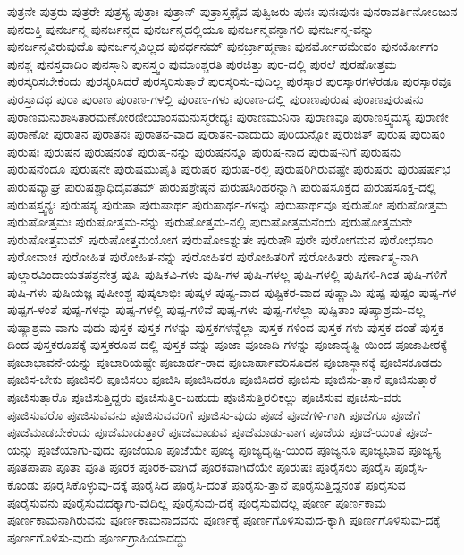 {ಪುತ್ರನೇ
ಪುತ್ರರು
ಪುತ್ರರೇ
ಪುತ್ರಸ್ಯ
ಪುತ್ರಾಃ
ಪುತ್ರಾನ್
ಪುತ್ರಾಸ್ತಥೈವ
ಪುತ್ವಿಜರು
ಪುನಃ
ಪುನಃಪುನಃ
ಪುನರಾವರ್ತಿನೋಽಜುನ
ಪುನರುಕ್ತಿ
ಪುನರ್ಜನ್ಮ
ಪುನರ್ಜನ್ಮದ
ಪುನರ್ಜನ್ಮದಲ್ಲಿಯೂ
ಪುನರ್ಜನ್ಮವನ್ನಾಗಲಿ
ಪುನರ್ಜನ್ಮ-ವನ್ನು
ಪುನರ್ಜನ್ಮವಿರುವುದೊ
ಪುನರ್ಜನ್ಮವಿಲ್ಲದ
ಪುನರ್ಧನಮ್
ಪುನರ್ಬ್ರಾಹ್ಮಣಾಃ
ಪುನರ್ಮೋಹಮೇವಂ
ಪುನರ್ಯೋಗಂ
ಪುನಶ್ಚ
ಪುನಸ್ತವಾದಿಂ
ಪುನಸ್ತಾನಿ
ಪುನಸ್ತ್ವಂ
ಪುಮಾಂಶ್ಚರತಿ
ಪುರಜಿತ್ತು
ಪುರ-ದಲ್ಲಿ
ಪುರಲೆ
ಪುರಷೋತ್ತಮ
ಪುರಸ್ಕರಿಸಬೇಕೆಂದು
ಪುರಸ್ಕರಿಸಿದರೆ
ಪುರಸ್ಕರಿಸುತ್ತಾರೆ
ಪುರಸ್ಕರಿಸು-ವುದಿಲ್ಲ
ಪುರಸ್ಕಾರ
ಪುರಸ್ಕಾರಗಳೆರಡೂ
ಪುರಸ್ಕಾರವೂ
ಪುರಸ್ತಾದಥ
ಪುರಾ
ಪುರಾಣ
ಪುರಾಣ-ಗಳಲ್ಲಿ
ಪುರಾಣ-ಗಳು
ಪುರಾಣ-ದಲ್ಲಿ
ಪುರಾಣಪುರುಷ
ಪುರಾಣಪುರುಷನು
ಪುರಾಣಮನುಶಾಸಿತಾರಮಣೋರಣೀಯಾಂಸಮನುಸ್ಮರೇದ್ಯಃ
ಪುರಾಣಮುನಿನಾ
ಪುರಾಣವೂ
ಪುರಾಣಸ್ತ್ವಮಸ್ಯ
ಪುರಾಣೀ
ಪುರಾಣೋ
ಪುರಾತನ
ಪುರಾತನಃ
ಪುರಾತನ-ವಾದ
ಪುರಾತನ-ವಾದುದು
ಪುರಿಯನ್ನೋ
ಪುರುಜಿತ್
ಪುರುಷ
ಪುರುಷಂ
ಪುರುಷಃ
ಪುರುಷನ
ಪುರುಷನಂತೆ
ಪುರುಷ-ನನ್ನು
ಪುರುಷನನ್ನೂ
ಪುರುಷ-ನಾದ
ಪುರುಷ-ನಿಗೆ
ಪುರುಷನು
ಪುರುಷನೆಂದೂ
ಪುರುಷನೇ
ಪುರುಷಮುಪೈತಿ
ಪುರುಷರ
ಪುರುಷ-ರಲ್ಲಿ
ಪುರುಷರಿಗಿರುವಷ್ಟೇ
ಪುರುಷರು
ಪುರುಷರ್ಷಭ
ಪುರುಷವ್ಯಾಘ್ರ
ಪುರುಷಶ್ಚಾಧಿದೈವತಮ್
ಪುರುಷಶ್ರೇಷ್ಠನೆ
ಪುರುಷಸಿಂಹರನ್ನಾಗಿ
ಪುರುಷಸೂಕ್ತದ
ಪುರುಷಸೂಕ್ತ-ದಲ್ಲಿ
ಪುರುಷಸ್ತ್ವನ್ಯಃ
ಪುರುಷಸ್ಯ
ಪುರುಷಾ
ಪುರುಷಾರ್ಥ
ಪುರುಷಾರ್ಥ-ಗಳನ್ನು
ಪುರುಷಾರ್ಥವೂ
ಪುರುಷೋ
ಪುರುಷೋತ್ತಮ
ಪುರುಷೋತ್ತಮಃ
ಪುರುಷೋತ್ತಮ-ನನ್ನು
ಪುರುಷೋತ್ತಮ-ನಲ್ಲಿ
ಪುರುಷೋತ್ತಮನೆಂದು
ಪುರುಷೋತ್ತಮನೇ
ಪುರುಷೋತ್ತಮಮ್
ಪುರುಷೋತ್ತಮಯೋಗ
ಪುರುಷೋಽಶ್ನುತೇ
ಪುರುಷೌ
ಪುರೇ
ಪುರೋಗಮನ
ಪುರೋಧಸಾಂ
ಪುರೋವಾಚ
ಪುರೋಹಿತ
ಪುರೋಹಿತ-ನನ್ನು
ಪುರೋಹಿತರ
ಪುರೋಹಿತರಿಗೆ
ಪುರೋಹಿತರು
ಪುರ್ಣಾತ್ಮ-ನಾಗಿ
ಪುಲ್ಲಾರವಿಂದಾಯತಪತ್ರನೇತ್ರ
ಪುಷಿ
ಪುಷಿಕವಿ-ಗಳು
ಪುಷಿ-ಗಳ
ಪುಷಿ-ಗಳಲ್ಲ
ಪುಷಿ-ಗಳಲ್ಲಿ
ಪುಷಿಗಳಿ-ಗಿಂತ
ಪುಷಿ-ಗಳಿಗೆ
ಪುಷಿ-ಗಳು
ಪುಷಿಯಜ್ಞ
ಪುಷೀಂಶ್ಚ
ಪುಷ್ಕಲಾಭಿಃ
ಪುಷ್ಕಳ
ಪುಷ್ಟ-ವಾದ
ಪುಷ್ಟಿಕರ-ವಾದ
ಪುಷ್ಣಾಮಿ
ಪುಷ್ಪ
ಪುಷ್ಪಂ
ಪುಷ್ಪ-ಗಳ
ಪುಷ್ಪಗ-ಳಂತೆ
ಪುಷ್ಪ-ಗಳನ್ನು
ಪುಷ್ಪ-ಗಳಲ್ಲಿ
ಪುಷ್ಪ-ಗಳಿವೆ
ಪುಷ್ಪ-ಗಳು
ಪುಷ್ಪ-ಗಳೆಲ್ಲಾ
ಪುಷ್ಪಿತಾಂ
ಪುಷ್ಯಾಶ್ರಮ-ವಲ್ಲ
ಪುಷ್ಯಾಶ್ರಮ-ವಾಗು-ವುದು
ಪುಸ್ತಕ
ಪುಸ್ತಕ-ಗಳನ್ನು
ಪುಸ್ತಕಗಳನ್ನೆಲ್ಲಾ
ಪುಸ್ತಕ-ಗಳಿಂದ
ಪುಸ್ತಕ-ಗಳು
ಪುಸ್ತಕ-ದಂತೆ
ಪುಸ್ತಕ-ದಿಂದ
ಪುಸ್ತಕರೂಪಕ್ಕೆ
ಪುಸ್ತಕರೂಪ-ದಲ್ಲಿ
ಪುಸ್ತಕ-ವನ್ನು
ಪೂಜಾ
ಪೂಜಾದಿ-ಗಳನ್ನು
ಪೂಜಾದೃಷ್ಟಿ-ಯಿಂದ
ಪೂಜಾಪೀಠಕ್ಕೆ
ಪೂಜಾಭಾವನೆ-ಯನ್ನು
ಪೂಜಾರಿಯಷ್ಟೇ
ಪೂಜಾರ್ಹ-ರಾದ
ಪೂಜಾರ್ಹಾವರಿಸೂದನ
ಪೂಜಾಸ್ಥಾನಕ್ಕೆ
ಪೂಜಿಸಕೂಡದು
ಪೂಜಿಸ-ಬೇಕು
ಪೂಜಿಸಲಿ
ಪೂಜಿಸಲು
ಪೂಜಿಸಿ
ಪೂಜಿಸಿದರೂ
ಪೂಜಿಸಿದರೆ
ಪೂಜಿಸು
ಪೂಜಿಸು-ತ್ತಾನೆ
ಪೂಜಿಸುತ್ತಾರೆ
ಪೂಜಿಸುತ್ತಾರೊ
ಪೂಜಿಸುತ್ತಿದ್ದರು
ಪೂಜಿಸುತ್ತಿರ-ಬಹುದು
ಪೂಜಿಸುತ್ತಿರಲಿಕಲ್ಲು
ಪೂಜಿಸುವ
ಪೂಜಿಸು-ವರು
ಪೂಜಿಸುವರೊ
ಪೂಜಿಸುವವನು
ಪೂಜಿಸುವವರಿಗೆ
ಪೂಜಿಸು-ವುದು
ಪೂಜೆ
ಪೂಜೆಗಳಿ-ಗಾಗಿ
ಪೂಜೆಗೂ
ಪೂಜೆಗೆ
ಪೂಜೆಮಾಡಬೇಕೆಂದು
ಪೂಜೆಮಾಡುತ್ತಾರೆ
ಪೂಜೆಮಾಡುವ
ಪೂಜೆಮಾಡು-ವಾಗ
ಪೂಜೆಯ
ಪೂಜೆ-ಯಂತೆ
ಪೂಜೆ-ಯನ್ನು
ಪೂಜೆಯಾಗು-ವುದು
ಪೂಜೆಯೂ
ಪೂಜೆಯೇ
ಪೂಜ್ಯ
ಪೂಜ್ಯದೃಷ್ಟಿ-ಯಿಂದ
ಪೂಜ್ಯನೂ
ಪೂಜ್ಯಭಾವ
ಪೂಜ್ಯಸ್ಯ
ಪೂತಪಾಪಾ
ಪೂತಾ
ಪೂತಿ
ಪೂರಕ
ಪೂರಕ-ವಾಗಿದೆ
ಪೂರಕವಾಗಿದೆಯೇ
ಪೂರುಷಃ
ಪೂರೈಸಲು
ಪೂರೈಸಿ
ಪೂರೈಸಿ-ಕೊಂಡು
ಪೂರೈಸಿಕೊಳ್ಳುವು-ದಕ್ಕೆ
ಪೂರೈಸಿದ
ಪೂರೈಸಿ-ದಂತೆ
ಪೂರೈಸು-ತ್ತಾನೆ
ಪೂರೈಸುತ್ತಿದ್ದನಂತೆ
ಪೂರೈಸುವ
ಪೂರೈಸುವನು
ಪೂರೈಸುವುದಕ್ಕಾಗು-ವುದಿಲ್ಲ
ಪೂರೈಸುವು-ದಕ್ಕೆ
ಪೂರೈಸುವುದಲ್ಲ
ಪೂರ್ಣ
ಪೂರ್ಣಕಾಮ
ಪೂರ್ಣಕಾಮನಾಗಿರುವನು
ಪೂರ್ಣಕಾಮನಾದವನು
ಪೂರ್ಣಕ್ಕೆ
ಪೂರ್ಣಗೊಳಿಸುವುದ-ಕ್ಕಾಗಿ
ಪೂರ್ಣಗೊಳಿಸುವು-ದಕ್ಕೆ
ಪೂರ್ಣಗೊಳಿಸು-ವುದು
ಪೂರ್ಣಗ್ರಾಹಿಯಾದದ್ದು
}
